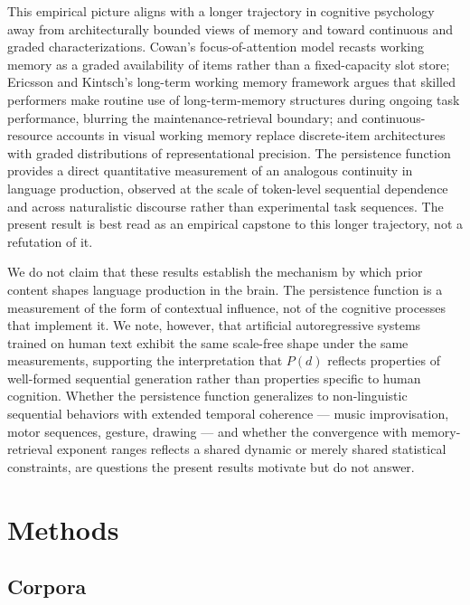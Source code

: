 \documentclass[11pt]{article}
\begin{document}
This empirical picture aligns with a longer trajectory in cognitive psychology away from
architecturally bounded views of memory and toward continuous and graded characterizations.
Cowan's focus-of-attention model \citep{cowan2001magical} recasts working memory as a graded
availability of items rather than a fixed-capacity slot store; Ericsson and Kintsch's
long-term working memory framework \citep{ericsson1995longterm} argues that skilled
performers make routine use of long-term-memory structures during ongoing task performance,
blurring the maintenance-retrieval boundary; and continuous-resource accounts in visual
working memory \citep{ma2014changing} replace discrete-item architectures with graded
distributions of representational precision. The persistence function provides a direct
quantitative measurement of an analogous continuity in language production, observed at the
scale of token-level sequential dependence and across naturalistic discourse rather than
experimental task sequences. The present result is best read as an empirical capstone to
this longer trajectory, not a refutation of it.

We do not claim that these results establish the mechanism by which prior content shapes
language production in the brain. The persistence function is a measurement of the form of
contextual influence, not of the cognitive processes that implement it. We note, however,
that artificial autoregressive systems trained on human text exhibit the same scale-free
shape under the same measurements, supporting the interpretation that $P(d)$ reflects
properties of well-formed sequential generation rather than properties specific to human
cognition. Whether the persistence function generalizes to non-linguistic sequential
behaviors with extended temporal coherence --- music improvisation, motor sequences, gesture,
drawing --- and whether the convergence with memory-retrieval exponent ranges reflects a
shared dynamic or merely shared statistical constraints, are questions the present results
motivate but do not answer.

\section{Methods}

\subsection{Corpora}
\end{document}
